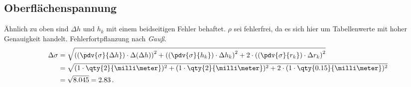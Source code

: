 \subsection{Oberflächenspannung}

Ähnlich zu oben sind $\Delta h$ und $h_k$ mit einem beidseitigen Fehler behaftet. $\rho$ sei fehlerfrei, da es sich hier um Tabellenwerte mit hoher Genauigkeit handelt.
Fehlerfortpflanzung nach \textit{Gauß}.
\begin{align*}
    \Delta \sigma &= \sqrt{ \left(\left(\pdv{\sigma}{\Delta h}\right) \cdot \Delta (\Delta h)\right)^2
                          + \left(\left(\pdv{\sigma}{h_k}\right) \cdot \Delta h_k\right)^2
                          + 2 \cdot \left(\left(\pdv{\sigma}{r_k}\right) \cdot \Delta r_k\right)^2
                          }\\
                  &= \sqrt{(1 \cdot \qty{2}{\milli\meter})^2 + (1 \cdot \qty{2}{\milli\meter})^2 + 2\cdot (1 \cdot \qty{0.15}{\milli\meter})^2} \\
                  &= \sqrt{8.045} = 2.83\, \text{.}
\end{align*}


